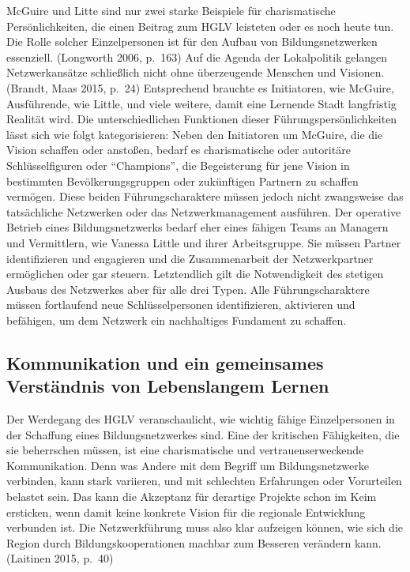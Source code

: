 \documentclass[a4paper,
fontsize=11pt,
oneside,
numbers=noperiodatend,
parskip=half-,
bibliography=totoc,
final
]{scrartcl}
\begin{document}
McGuire und Litte sind nur zwei starke Beispiele für charismatische
Persönlichkeiten, die einen Beitrag zum HGLV leisteten oder es noch
heute tun. Die Rolle solcher Einzelpersonen ist für den Aufbau von
Bildungsnetzwerken essenziell. (Longworth 2006, p.~163) Auf die Agenda
der Lokalpolitik gelangen Netzwerkansätze schließlich nicht ohne
überzeugende Menschen und Visionen. (Brandt, Maas 2015, p.~24)
Entsprechend brauchte es Initiatoren, wie McGuire, Ausführende, wie
Little, und viele weitere, damit eine Lernende Stadt langfristig
Realität wird. Die unterschiedlichen Funktionen dieser
Führungspersönlichkeiten lässt sich wie folgt kategorisieren: Neben den
Initiatoren um McGuire, die die Vision schaffen oder anstoßen, bedarf es
charismatische oder autoritäre Schlüsselfiguren oder
\enquote{Champions}, die Begeisterung für jene Vision in bestimmten
Bevölkerungsgruppen oder zukünftigen Partnern zu schaffen vermögen.
Diese beiden Führungscharaktere müssen jedoch nicht zwangsweise das
tatsächliche Netzwerken oder das Netzwerkmanagement ausführen. Der
operative Betrieb eines Bildungsnetzwerks bedarf eher eines fähigen
Teams an Managern und Vermittlern, wie Vanessa Little und ihrer
Arbeitsgruppe. Sie müssen Partner identifizieren und engagieren und die
Zusammenarbeit der Netzwerkpartner ermöglichen oder gar steuern.
Letztendlich gilt die Notwendigkeit des stetigen Ausbaus des Netzwerkes
aber für alle drei Typen. Alle Führungscharaktere müssen fortlaufend
neue Schlüsselpersonen identifizieren, aktivieren und befähigen, um dem
Netzwerk ein nachhaltiges Fundament zu schaffen.

\hypertarget{kommunikation-und-ein-gemeinsames-verstuxe4ndnis-von-lebenslangem-lernen}{%
\subsection*{Kommunikation und ein gemeinsames Verständnis von
Lebenslangem
Lernen}\label{kommunikation-und-ein-gemeinsames-verstuxe4ndnis-von-lebenslangem-lernen}}

Der Werdegang des HGLV veranschaulicht, wie wichtig fähige
Einzelpersonen in der Schaffung eines Bildungsnetzwerkes sind. Eine der
kritischen Fähigkeiten, die sie beherrschen müssen, ist eine
charismatische und vertrauenserweckende Kommunikation. Denn was Andere
mit dem Begriff um Bildungsnetzwerke verbinden, kann stark variieren,
und mit schlechten Erfahrungen oder Vorurteilen belastet sein. Das kann
die Akzeptanz für derartige Projekte schon im Keim ersticken, wenn damit
keine konkrete Vision für die regionale Entwicklung verbunden ist. Die
Netzwerkführung muss also klar aufzeigen können, wie sich die Region
durch Bildungskooperationen machbar zum Besseren verändern kann.
(Laitinen 2015, p.~40)
\end{document}
